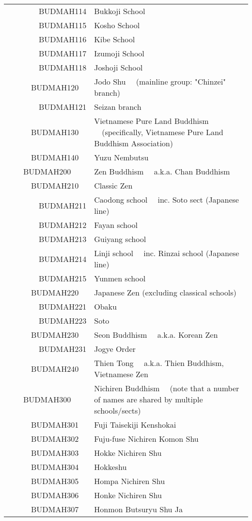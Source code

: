 \documentclass[12pt]{article}
\begin{document}
\begin{tiny}
\begin{center}
\begin{longtable}{|l|l|}
~~~~~~~~BUDMAH114 & Bukkoji School \\
~~~~~~~~BUDMAH115 & Kosho School \\
~~~~~~~~BUDMAH116 & Kibe School \\
~~~~~~~~BUDMAH117 & Izumoji School \\
~~~~~~~~BUDMAH118 & Joshoji School \\
~~~~~~BUDMAH120 & Jodo Shu	~~(mainline group: "Chinzei" branch) \\
~~~~~~~~BUDMAH121 & Seizan branch \\
~~~~~~BUDMAH130 & Vietnamese Pure Land Buddhism	~~(specifically, Vietnamese Pure Land Buddhism Association) \\
~~~~~~BUDMAH140 & Yuzu Nembutsu \\
~~~~BUDMAH200 & Zen Buddhism	~~a.k.a. Chan Buddhism \\
~~~~~~BUDMAH210 & Classic Zen \\
~~~~~~~~BUDMAH211 & Caodong school	~~inc. Soto sect (Japanese line) \\
~~~~~~~~BUDMAH212 & Fayan school \\
~~~~~~~~BUDMAH213 & Guiyang school \\
~~~~~~~~BUDMAH214 & Linji school	~~inc. Rinzai school (Japanese line) \\
~~~~~~~~BUDMAH215 & Yunmen school \\
~~~~~~BUDMAH220 & Japanese Zen (excluding classical schools) \\
~~~~~~~~BUDMAH221 & Obaku \\
~~~~~~~~BUDMAH223 & Soto \\
~~~~~~BUDMAH230 & Seon Buddhism	~~a.k.a. Korean Zen \\
~~~~~~~~BUDMAH231 & Jogye Order \\
~~~~~~BUDMAH240 & Thien Tong	~~a.k.a. Thien Buddhism, Vietnamese Zen \\
~~~~BUDMAH300 & Nichiren Buddhism	~~(note that a number of names are shared by multiple schools/sects) \\
~~~~~~BUDMAH301 & Fuji Taisekiji Kenshokai \\
~~~~~~BUDMAH302 & Fuju-fuse Nichiren Komon Shu \\
~~~~~~BUDMAH303 & Hokke Nichiren Shu \\
~~~~~~BUDMAH304 & Hokkeshu \\
~~~~~~BUDMAH305 & Hompa Nichiren Shu \\
~~~~~~BUDMAH306 & Honke Nichiren Shu \\
~~~~~~BUDMAH307 & Honmon Butsuryu Shu Ja \\

\end{longtable}
\end{center}
\end{tiny}
\end{document}
